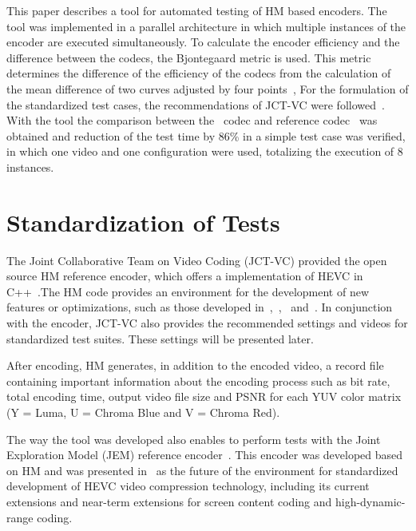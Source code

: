 \documentclass[journal]{IEEEtran}
\begin{document}
This paper describes a tool for automated testing of HM based encoders. The tool was implemented in a parallel architecture in which multiple instances of the encoder are executed simultaneously. To calculate the encoder efficiency and the difference between the codecs, the Bjontegaard metric is used. This metric determines the difference of the efficiency of the codecs from the calculation of the mean difference of two curves adjusted by four points~\cite{Bjontegaard:01}, For the formulation of the standardized test cases, the recommendations of JCT-VC were followed~\cite{Bossen:15}. With the tool the comparison between the~\cite{oliveira:16} codec and reference codec~\cite{itu:10} was obtained and reduction of the test time by 86\% in a simple test case was verified, in which one video and one configuration were used, totalizing the execution of 8 instances.
	
	
\section{Standardization of Tests}	



The Joint Collaborative Team on Video Coding (JCT-VC) provided the open source HM reference encoder, which offers a implementation of HEVC in C++~\cite{Bossen:15}.The HM code provides an environment for the development of new features or optimizations, such as those developed in~\cite{oliveira:16},~\cite{Yoon:13},~\cite{Correa:12} and~\cite{Weerakkody:14}. In conjunction with the encoder, JCT-VC also provides the recommended settings and videos for standardized test suites. These settings will be presented later.

After encoding, HM generates, in addition to the encoded video, a record file containing important information about the encoding process such as bit rate, total encoding time, output video file size and PSNR for each YUV color matrix (Y = Luma, U = Chroma Blue and V = Chroma Red).


The way the tool was developed also enables to perform tests with the Joint Exploration Model (JEM) reference encoder~\cite{Bossen:17}. This encoder was developed based on HM and was presented in~\cite{JVET:2015} as the future of the environment for standardized development of HEVC video compression technology, including its current extensions and near-term extensions for screen content coding and high-dynamic-range coding.
\end{document}
